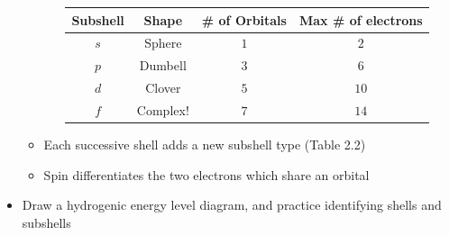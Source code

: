 \documentclass[12pt, openany, letterpaper]{memoir}
\begin{document}
\begin{itemize}
\begin{itemize}
\begin{itemize}
			                  \begin{tabular}{c|c|c|c}
				                  Subshell & Shape    & \# of Orbitals & Max \# of electrons \\ \midrule
				                  $s$      & Sphere   & $1$            & $2$                 \\
				                  $p$      & Dumbell  & $3$            & $6$                 \\
				                  $d$      & Clover   & $5$            & $10$                \\
				                  $f$      & Complex! & $7$            & $14$
			                  \end{tabular}
		            \end{itemize}
		      \item Each successive shell adds a new subshell type (Table 2.2)
		      \item Spin differentiates the two electrons which share an orbital
	      \end{itemize}
	\item Draw a hydrogenic energy level diagram, and practice identifying shells and subshells
\end{itemize}
\end{document}
